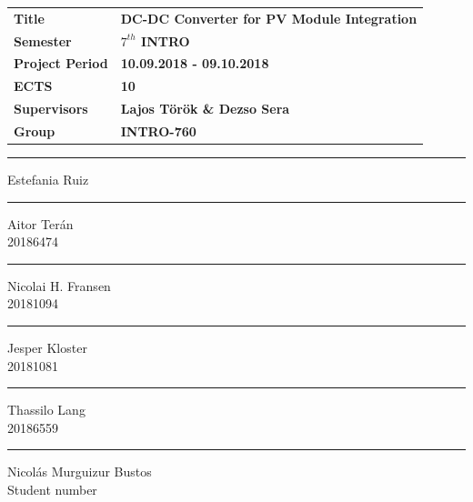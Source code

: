 \vspace*{1cm}
\begin{table}[H]
	\begin{tabular}{l l} 
		\textbf{Title} &  \textbf{DC-DC Converter for PV Module Integration} \\ 
		\textbf{Semester} & \textbf{$7^{th}$ INTRO}  \\ 
		\textbf{Project Period} & \textbf{10.09.2018 - 09.10.2018}  \\ 
		\textbf{ECTS} &  \textbf{10}\\ 
		\textbf{Supervisors} & \textbf{Lajos Török \& Dezso Sera}  \\ 
		\textbf{Group} & \textbf{INTRO-760}  \\ 
	\end{tabular}
\end{table}

\vspace*{2cm}
\begin{center}	
	\vspace{50pt}
	\begin{minipage}{0.4\linewidth}
		\centering
		\hrule
		\vspace{12pt}
		Estefania Ruiz\\ 
		
	\end{minipage}
	\hspace{10pt}
	\vspace{40pt}
	\begin{minipage}{0.4\linewidth}
		\centering
		\hrule
		\vspace{12pt}
		Aitor Terán\\ 
		20186474	
	\end{minipage}
	\hspace{10pt}
	\vspace{40pt}
	\begin{minipage}{0.4\linewidth}
		\centering
		\hrule
		\vspace{12pt}
		Nicolai H. Fransen\\
		20181094
	\end{minipage}
	\hspace{10pt}
	\begin{minipage}{0.4\linewidth}
		\centering
		\hrule
		\vspace{12pt}
		Jesper Kloster\\
		20181081 
	\end{minipage}
	\hspace{10pt}
	\begin{minipage}{0.4\linewidth}
		\centering
		\hrule
		\vspace{12pt}
		Thassilo Lang\\ 
		20186559 
	\end{minipage}
	\hspace{10pt}
	\vspace{20pt}
	\begin{minipage}{0.4\linewidth}
		\centering
		\hrule
		\vspace{12pt}
		Nicolás Murguizur Bustos\\ 
		Student number %
	\end{minipage}
\end{center}

